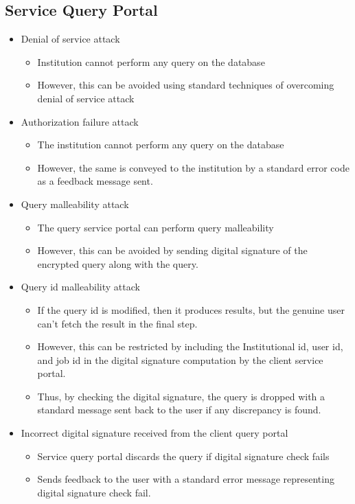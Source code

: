 \label{possible-attacks_in_components}

\subsection{Service Query Portal}
\begin{itemize}
    \item Denial of service attack
          \begin{itemize}
              \item Institution cannot perform any query on the database
              \item However, this can be avoided using standard techniques of overcoming denial of service attack
          \end{itemize}
    \item Authorization failure attack
          \begin{itemize}
              \item The institution cannot perform any query on the database
              \item However, the same is conveyed to the institution by a standard error code as a feedback message sent.
          \end{itemize}
    \item Query malleability attack
          \begin{itemize}
              \item The query service portal can perform query malleability
              \item However, this can be avoided by sending digital signature of the encrypted query along with the query.
          \end{itemize}
    \item Query id malleability attack
          \begin{itemize}
              \item If the query id is modified, then it produces results, but the genuine user can’t fetch the result in the final step.
              \item However, this can be restricted by including the Institutional id, user id, and job id in the digital signature computation by the client service portal.
              \item Thus, by checking the digital signature, the query is dropped with a standard message sent back to the user if any discrepancy is found.
          \end{itemize}
    \item Incorrect digital signature received from the client query portal
          \begin{itemize}
              \item Service query portal discards the query if digital signature check fails
              \item Sends feedback to the user with a standard error message representing digital signature check fail.
          \end{itemize}
\end{itemize}
